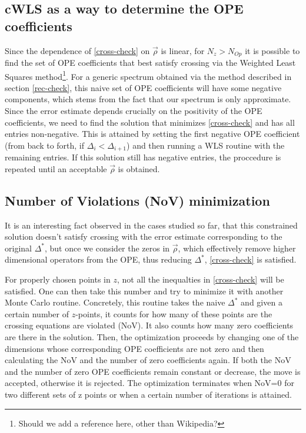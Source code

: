 \documentclass[letterpaper]{article}
\numberwithin{equation}{section}
\begin{document}
\subsection{cWLS as a way to determine the OPE coefficients}
\label{cWLS}
Since the dependence of \ref{cross-check} on $\vec{\rho}$ is linear, for
$N_z>N_{Op}$ it is possible to find the set of OPE coefficients that best
satisfy crossing via the Weighted Least Squares method\footnote{Should we add a
reference here, other than Wikipedia?}. 
For a generic spectrum
obtained via the method described in section \ref{rec-check}, this naive set of OPE
coefficients will have some negative components, which stems from the
fact that our spectrum is only approximate. Since the error estimate
\label{finalest4}
depends
crucially on the positivity of the OPE coefficients, we need to find the
solution that minimizes \ref{cross-check} and has all entries non-negative. This
is attained by setting the first negative OPE coefficient (from back to forth,
if $\Delta_i<\Delta_{i+1}$) and then running a WLS routine with the remaining
entries. If this solution still has negative entries, the proccedure is repeated
until an acceptable $\vec{\rho}$ is obtained.


\subsection{Number of Violations (NoV) minimization}
It is an interesting fact observed in the cases studied so far, that this
constrained solution doesn't satisfy crossing with the error estimate
corresponding to the original $\Delta^*$, but once we consider the zeros in
$\vec{\rho}$, which effectively remove higher dimensional operators from the
OPE, thus reducing $\Delta^*$, \ref{cross-check} is satisfied.

For properly chosen
points in $z$, not all the inequalties in \ref{cross-check} will be satisfied.
One can then take this number and try to minimize it with another Monte Carlo
routine. Concretely, this routine takes the naive $\Delta^*$ and given a certain
number of $z$-points, it counts for how many of these points are the crossing
equations are violated (NoV). It also counts how many zero coefficients are there in
the solution. Then, the optimization proceeds by changing one of the dimensions
whose corresponding OPE coefficients are not zero and then calculating the NoV
and the number of zero coefficients again. If both the NoV and the number of
zero OPE coefficients remain constant or decrease, the move is accepted,
otherwise it is rejected. The optimization terminates when NoV=0 for two
different sets of z points or when a certain number of iterations is attained.
\end{document}
